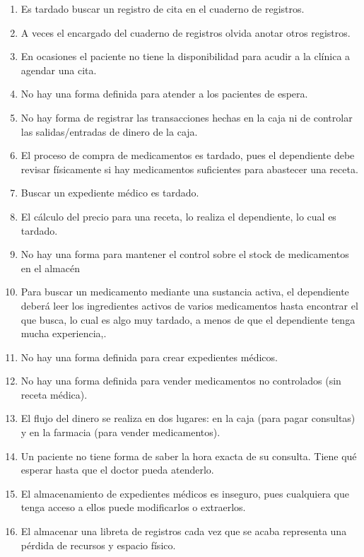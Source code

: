 \begin{enumerate}
\item Es tardado buscar un registro de cita en el cuaderno de registros.
\item A veces el encargado del cuaderno de registros olvida anotar otros registros.
\item En ocasiones el paciente no tiene la disponibilidad para acudir a la cl\'inica a agendar una cita.
\item No hay una forma definida para atender a los pacientes de espera.
\item No hay forma de registrar las transacciones hechas en la caja ni de controlar las salidas/entradas de dinero de la caja.
\item El proceso de compra de medicamentos es tardado, pues el dependiente debe revisar f\'isicamente si hay medicamentos suficientes para abastecer una receta.
\item Buscar un expediente m\'edico es tardado.
\item El c\'alculo del precio para una receta, lo realiza el dependiente, lo cual es tardado.
\item No hay una forma para mantener el control sobre el stock de medicamentos en el almac\'en
\item Para buscar un medicamento mediante una sustancia activa, el dependiente deber\'a leer los ingredientes activos de varios medicamentos hasta encontrar el que busca, lo cual es algo muy tardado, a menos de que el dependiente tenga mucha experiencia,.
\item No hay una forma definida para crear expedientes m\'edicos.
\item No hay una forma definida para vender medicamentos no controlados (sin receta m\'edica).
\item El flujo del dinero se realiza en dos lugares: en la caja (para pagar consultas) y en la farmacia (para vender medicamentos).
\item Un paciente no tiene forma de saber la hora exacta de su consulta. Tiene qu\'e esperar hasta que el doctor pueda atenderlo.
\item El almacenamiento de expedientes m\'edicos es inseguro, pues cualquiera que tenga acceso a ellos puede modificarlos o extraerlos.
\item El almacenar una libreta de registros cada vez que se acaba representa una p\'erdida de recursos y espacio f\'isico.



\end{enumerate}

